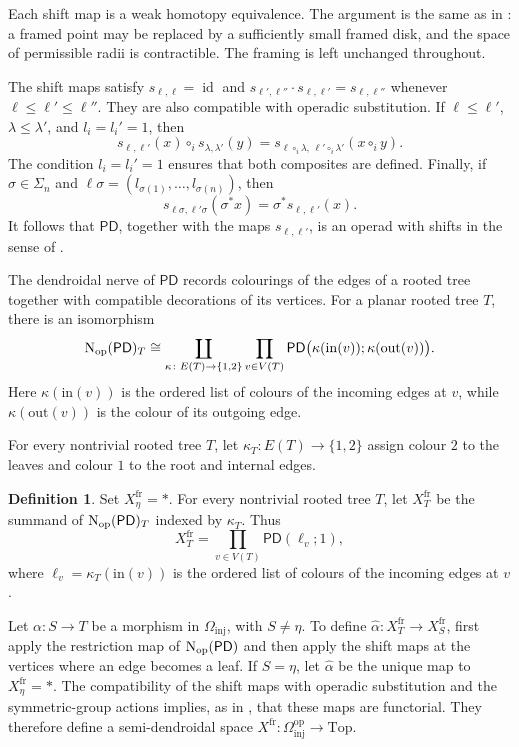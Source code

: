 \documentclass{amsart}
\newcommand{\Top}{\mathrm{Top}}
\newcommand{\id}{\operatorname{id}}
\newcommand{\nerve}{\textnormal{N}}
\theoremstyle{definition}
\newtheorem{definition}[theorem]{Definition}%
\numberwithin{equation}{section}
\begin{document}
Each shift map is a weak homotopy equivalence. The argument is the
same as in \cite[Example~1]{hackney_config}: a framed point may be
replaced by a sufficiently small framed disk, and the space of
permissible radii is contractible. The framing is left unchanged
throughout.

The shift maps satisfy $s_{\ell,\ell}=\id$ and
$s_{\ell',\ell''}\cdot s_{\ell,\ell'}=s_{\ell,\ell''}$ whenever
$\ell\leq\ell'\leq\ell''$. They are also compatible with operadic
substitution. If $\ell\leq\ell'$, $\lambda\leq\lambda'$, and
$l_i=l_i'=1$, then
\[
s_{\ell,\ell'}(x)\circ_i s_{\lambda,\lambda'}(y)
=
s_{\ell\circ_i\lambda,\,
  \ell'\circ_i\lambda'}(x\circ_i y).
\]
The condition $l_i=l_i'=1$ ensures that both composites are defined.
Finally, if $\sigma\in\Sigma_n$ and
$\ell\sigma=(l_{\sigma(1)},\ldots,l_{\sigma(n)})$, then
\[
s_{\ell\sigma,\ell'\sigma}(\sigma^*x)
=
\sigma^*s_{\ell,\ell'}(x).
\]
It follows that $\mathsf{PD}$, together with the maps
$s_{\ell,\ell'}$, is an operad with shifts in the sense of
\cite{hackney_config}.

The dendroidal nerve of $\mathsf{PD}$ records colourings of the edges
of a rooted tree together with compatible decorations of its
vertices. For a planar rooted tree $T$, there is an isomorphism
\[
\nerve_{\mathrm{op}}(\mathsf{PD})_T
\cong
\coprod_{\kappa\colon E(T)\to\{1,2\}}
\prod_{v\in V(T)}
\mathsf{PD}\bigl(
\kappa(\mathrm{in}(v));\kappa(\mathrm{out}(v))
\bigr).
\]
Here $\kappa(\mathrm{in}(v))$ is the ordered list of colours of the
incoming edges at $v$, while $\kappa(\mathrm{out}(v))$ is the colour
of its outgoing edge.

For every nontrivial rooted tree $T$, let
$\kappa_T\colon E(T)\to\{1,2\}$ assign colour $2$ to the leaves and
colour $1$ to the root and internal edges.

\begin{definition}
\label{def: infinity operad of framed config}
Set $X^{\mathrm{fr}}_\eta=*$. For every nontrivial rooted tree $T$,
let $X^{\mathrm{fr}}_T$ be the summand of
$\nerve_{\mathrm{op}}(\mathsf{PD})_T$ indexed by $\kappa_T$. Thus
\[
X^{\mathrm{fr}}_T
=
\prod_{v\in V(T)}
\mathsf{PD}(\ell_v;1),
\]
where $\ell_v=\kappa_T(\mathrm{in}(v))$ is the ordered list of colours
of the incoming edges at $v$.

Let $\alpha\colon S\to T$ be a morphism in
$\Omega_{\mathrm{inj}}$, with $S\neq\eta$. To define
$\widehat\alpha\colon X^{\mathrm{fr}}_T\to X^{\mathrm{fr}}_S$, first
apply the restriction map of
$\nerve_{\mathrm{op}}(\mathsf{PD})$ and then apply the shift maps at
the vertices where an edge becomes a leaf. If $S=\eta$, let
$\widehat\alpha$ be the unique map to $X^{\mathrm{fr}}_\eta=*$. The
compatibility of the shift maps with operadic substitution and the
symmetric-group actions implies, as in
\cite[Theorem~3]{hackney_config}, that these maps are functorial.
They therefore define a semi-dendroidal space
$X^{\mathrm{fr}}\colon
\Omega_{\mathrm{inj}}^{\mathrm{op}}\to\Top$.
\end{definition}
\end{document}
